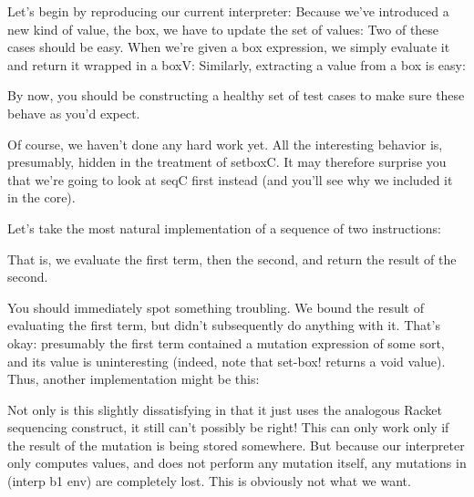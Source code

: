 
Let’s begin by reproducing our current interpreter:
Because we’ve introduced a new kind of value, the box, we have to update the set
of values:
Two of these cases should be easy. When we’re given a box expression, we simply
evaluate it and return it wrapped in a boxV:
Similarly, extracting a value from a box is easy:

By now, you should be constructing a healthy set of test cases to make sure
these behave as you’d expect.

Of course, we haven’t done any hard work yet. All the interesting behavior is,
presumably, hidden in the treatment of setboxC. It may therefore surprise you
that we’re going to look at seqC first instead (and you’ll see why we included
it in the core).

Let’s take the most natural implementation of a sequence of two instructions:

That is, we evaluate the first term, then the second, and return the result of
the second.

You should immediately spot something troubling. We bound the result of
evaluating the first term, but didn’t subsequently do anything with it. That’s
okay: presumably the first term contained a mutation expression of some sort,
and its value is uninteresting (indeed, note that set-box! returns a void
value). Thus, another implementation might be this:

Not only is this slightly dissatisfying in that it just uses the analogous
Racket sequencing construct, it still can’t possibly be right! This can only
work only if the result of the mutation is being stored somewhere. But because
our interpreter only computes values, and does not perform any mutation itself,
any mutations in (interp b1 env) are completely lost. This is obviously not what
we want.
